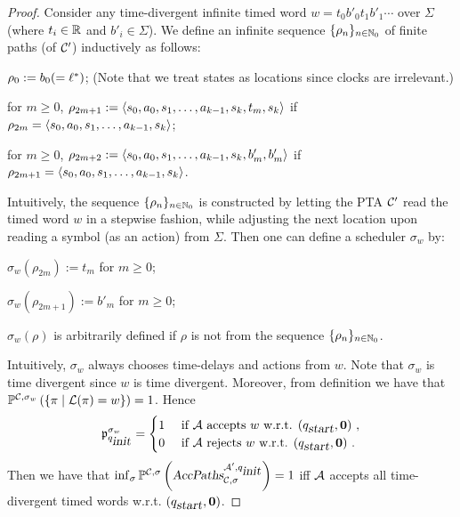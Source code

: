 \begin{proof}
Consider any time-divergent infinite timed word $ w = t_0 b'_0 t_1 b'_1 \cdots $ over $\Sigma$ (where $t_i\in\mathbb{R}$ and $b'_i\in\Sigma$).
We define an infinite sequence $\{\rho_n\}_{n\in\mathbb{N}_0}$ of finite paths (of $\mathcal{C}'$) inductively as follows:
\begin{compactitem}
\item $\rho_0:=b_0(=\ell^*)$; (Note that we treat states as locations since clocks are irrelevant.)
\item for $m\ge 0$, $\rho_{2m+1}:=\left\langle s_0,a_0,s_1,\dots,a_{k-1},s_{k},t_{m}, s_{k}\right\rangle$ if $\rho_{2m}=\left\langle s_0,a_0,s_1,\dots,a_{k-1},s_{k}\right\rangle$;
\item for $m\ge 0$, $\rho_{2m+2}:=\left\langle s_0,a_0,s_1,\dots,a_{k-1},s_{k},b'_{m}, b'_m\right\rangle$ if $\rho_{2m+1}=\left\langle s_0,a_0,s_1,\dots,a_{k-1},s_{k}\right\rangle$. 
\end{compactitem}
Intuitively, the sequence $\{\rho_n\}_{n\in\mathbb{N}_0}$ is constructed by letting the PTA $\mathcal{C}'$ read the timed word $w$ in a stepwise fashion, while adjusting the next location upon reading a symbol (as an action) from $\Sigma$.
Then one can define a scheduler $\sigma_w$ by:
\begin{compactitem}
\item $\sigma_w(\rho_{2m}):=t_m$ for $m\ge 0$; 
\item $\sigma_w(\rho_{2m+1}):=b'_{m}$ for $m\ge 0$;
\item $\sigma_w(\rho)$ is arbitrarily defined if $\rho$ is not from the sequence $\{\rho_n\}_{n\in\mathbb{N}_0}$. 
\end{compactitem}
Intuitively, $\sigma_w$ always chooses time-delays and actions from $w$. 
Note that $\sigma_w$ is time divergent since $w$ is time divergent.
Moreover, from definition we have that 
$
    \mathbb{P}^{\mathcal{C},\sigma_w }\left(
        \left \{\pi\mid \mathcal{L}(\pi)=w
        \right \}
    \right)
    = 1
$.
Hence
$$
    \mathfrak{p}_{q_{\mbox{\sl init} }}^{\sigma_w}
        =   \begin{cases}
            1 & \mbox{ if $\mathcal{A}$ accepts $w$ w.r.t. $(q_{\mbox{\sl start}},\mathbf{0})$ },\\
            0 & \mbox{ if $\mathcal{A}$ rejects $w$ w.r.t. $(q_{\mbox{\sl start}},\mathbf{0})$ }.
        \end{cases}
$$
Then we have that 
$
\inf_\sigma \mathbb{P}^{\mathcal{C},\sigma}\left(
    \mbox{\sl AccPaths} _{\mathcal{C},\sigma} ^{\mathcal{A}',q_{\mbox{\sl init} }}
\right)
    = 1
$
iff
$\mathcal{A}$ accepts all time-divergent timed words w.r.t. $(q_{\mbox{\sl start}},\mathbf{0})$.
\end{proof}
